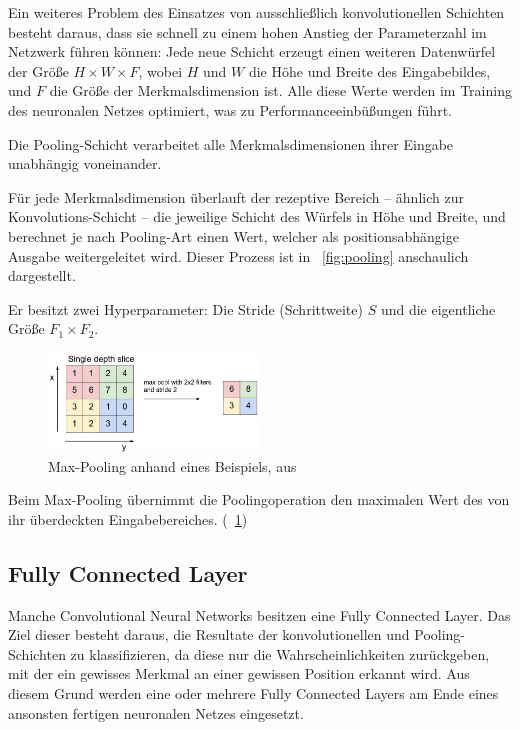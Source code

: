 Ein weiteres Problem des Einsatzes von ausschließlich konvolutionellen Schichten besteht daraus, dass sie schnell zu einem hohen Anstieg der Parameterzahl im Netzwerk führen können: Jede neue Schicht erzeugt einen weiteren Datenwürfel der Größe $H\times W\times F$, wobei $H$ und $W$ die Höhe und Breite des Eingabebildes, und $F$ die Größe der Merkmalsdimension ist. Alle diese Werte werden im Training des neuronalen Netzes optimiert, was zu Performanceeinbüßungen führt. \cite{cs231n}

Die Pooling-Schicht verarbeitet alle Merkmalsdimensionen ihrer Eingabe unabhängig voneinander.

Für jede Merkmalsdimension überlauft der rezeptive Bereich -- ähnlich zur Konvolutions-Schicht -- die jeweilige Schicht des Würfels in Höhe und Breite, und berechnet je nach Pooling-Art einen Wert, welcher als positionsabhängige Ausgabe weitergeleitet wird. Dieser Prozess ist in \figurename~\ref{fig:pooling} anschaulich dargestellt.

Er besitzt zwei Hyperparameter: Die Stride (Schrittweite) $S$ und die eigentliche Größe $F_1\times F_2$. \cite{cs231n}

\begin{figure}[H]
	\centering
	\includegraphics[width=0.5\textwidth,keepaspectratio]{images/cs231n/maxpool.jpg}
	\captionsetup{format=plain}
	\caption{Max-Pooling anhand eines Beispiels, aus \cite{cs231n}}
	\label{fig:maxpooling}
\end{figure}

Beim Max-Pooling übernimmt die Poolingoperation den maximalen Wert des von ihr überdeckten Eingabebereiches. (\vgl \figurename~\ref{fig:maxpooling})

\subsection{Fully Connected Layer}
\label{ssec:fcn}
Manche Convolutional Neural Networks besitzen eine Fully Connected Layer. Das Ziel dieser besteht daraus, die Resultate der konvolutionellen und Pooling-Schichten zu klassifizieren, da diese nur die Wahrscheinlichkeiten zurückgeben, mit der ein gewisses Merkmal an einer gewissen Position erkannt wird. Aus diesem Grund werden eine oder mehrere Fully Connected Layers am Ende eines ansonsten fertigen neuronalen Netzes eingesetzt. \cite{geva}

